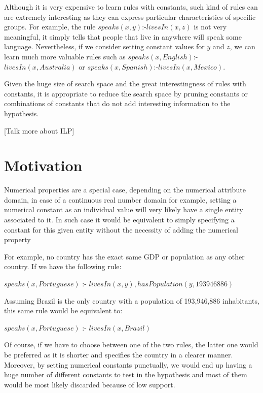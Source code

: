 Although it is very expensive to learn rules with constants, such kind of rules can are extremely interesting as they
can express particular characteristics of specific groups. For example, the rule $speaks(x,y)$:-$livesIn(x,z)$ is not
very meaningful, it simply tells that people that live in anywhere will speak some language. Nevertheless, if we
consider setting constant values for $y$ and $z$, we can learn much more valuable rules such as
$speaks(x,English)$:-$livesIn(x,Australia)$ or $speaks(x,Spanish)$:-$livesIn(x,Mexico)$.

Given the huge size of search space and the great interestingness of rules with constants, it is appropriate to reduce
the search space by pruning constants or combinations of constants that do not add interesting information to the
hypothesis.

[Talk more about ILP]


\section{Motivation}

Numerical properties are a special case, depending on the numerical attribute
domain, in case of a continuous real number domain for example, setting a numerical constant as an individual value will
very likely have a single entity associated to it. In such case it would be equivalent to simply specifying a constant
for this given entity without the necessity of adding the numerical property

For example, no country has the exact same GDP or population as any other country. If we have the following rule:

\begin{center}
 $speaks(x,Portuguese)$ :- $livesIn(x,y),hasPopulation(y,193946886)$
\end{center}

Assuming Brazil is the only country with a population of 193,946,886 inhabitants, this same rule would be equivalent to:

\begin{center}
 $speaks(x,Portuguese)$ :- $livesIn(x,Brazil)$
\end{center}

Of course, if we have to choose between one of the two rules, the latter one would be preferred as it is shorter and
specifies the country in a clearer manner. Moreover, by setting numerical constants punctually, we would end up having a
huge number of different constants to test in the hypothesis and most of them would be most likely discarded because of
low support.

